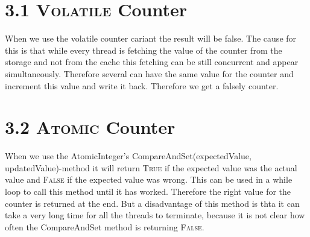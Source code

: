 \documentclass{article}
\begin{document}
	\pagestyle{fancy}
	
	\section*{3.1 \textsc{Volatile} Counter}
	\begin{adjustwidth}{2em}{2em}
		When we use the volatile counter cariant the result will be false. The cause for this is that while every thread is fetching the value of the counter from the storage and not from the cache this fetching can be still concurrent and appear simultaneously. Therefore several can have the same value for the counter and increment this value and write it back. Therefore we get a falsely counter.
	\end{adjustwidth}
	
	\section*{3.2 \textsc{Atomic} Counter}
	\begin{adjustwidth}{2em}{2em}
		When we use the AtomicInteger's CompareAndSet(expectedValue, updatedValue)-method it will return \textsc{True} if the expected value was the actual value and \textsc{False} if the expected value was wrong. This can be used in a while loop to call this method until it has worked. Therefore the right value for the counter is returned at the end. But a disadvantage of this method is thta it can take a very long time for all the threads to terminate, because it is not clear how often the CompareAndSet method is returning \textsc{False}.
	\end{adjustwidth}
\end{document}
